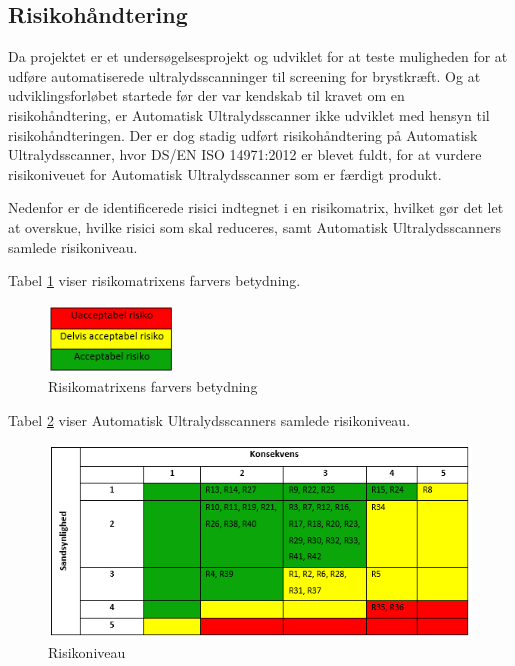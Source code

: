 \subsection{Risikohåndtering}
Da projektet er et undersøgelsesprojekt og udviklet for at teste muligheden for at udføre automatiserede ultralydsscanninger til screening for brystkræft. Og at udviklingsforløbet startede før der var kendskab til kravet om en risikohåndtering, er Automatisk Ultralydsscanner ikke udviklet med hensyn til risikohåndteringen. Der er dog stadig udført risikohåndtering på Automatisk Ultralydsscanner, hvor DS/EN ISO 14971:2012 er blevet fuldt, for at vurdere risikoniveuet for Automatisk Ultralydsscanner som er færdigt produkt. 

Nedenfor er de identificerede risici indtegnet i en risikomatrix, hvilket gør det let at overskue, hvilke risici som skal reduceres, samt Automatisk Ultralydsscanners samlede risikoniveau.  

Tabel \ref{Niveau} viser risikomatrixens farvers betydning. 

\begin{figure}[H]
    \centering
    \includegraphics[width=0.30\textwidth]{figurer/r/Niveau}
    \caption{Risikomatrixens farvers betydning}
    \label{Niveau}
\end{figure}

Tabel \ref{Risiko} viser Automatisk Ultralydsscanners samlede risikoniveau. 

\begin{figure}[H]
    \centering
    \includegraphics[width=1\textwidth]{figurer/r/Risiko}
    \caption{Risikoniveau}
    \label{Risiko}
\end{figure}

